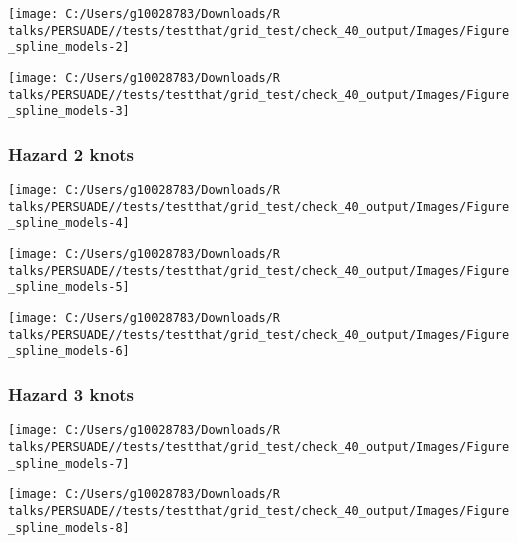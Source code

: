 \documentclass[
]{article}
\begin{document}
\begin{flushleft}\texttt{[image: C:/Users/g10028783/Downloads/R talks/PERSUADE//tests/testthat/grid\_test/check\_40\_output/Images/Figure\_spline\_models-2]} \end{flushleft}

\begin{flushleft}\texttt{[image: C:/Users/g10028783/Downloads/R talks/PERSUADE//tests/testthat/grid\_test/check\_40\_output/Images/Figure\_spline\_models-3]} \end{flushleft}

\clearpage

\subsubsection{Hazard 2 knots}\label{hazard-2-knots}

\begin{flushleft}\texttt{[image: C:/Users/g10028783/Downloads/R talks/PERSUADE//tests/testthat/grid\_test/check\_40\_output/Images/Figure\_spline\_models-4]} \end{flushleft}

\begin{flushleft}\texttt{[image: C:/Users/g10028783/Downloads/R talks/PERSUADE//tests/testthat/grid\_test/check\_40\_output/Images/Figure\_spline\_models-5]} \end{flushleft}

\begin{flushleft}\texttt{[image: C:/Users/g10028783/Downloads/R talks/PERSUADE//tests/testthat/grid\_test/check\_40\_output/Images/Figure\_spline\_models-6]} \end{flushleft}

\clearpage

\subsubsection{Hazard 3 knots}\label{hazard-3-knots}

\begin{flushleft}\texttt{[image: C:/Users/g10028783/Downloads/R talks/PERSUADE//tests/testthat/grid\_test/check\_40\_output/Images/Figure\_spline\_models-7]} \end{flushleft}

\begin{flushleft}\texttt{[image: C:/Users/g10028783/Downloads/R talks/PERSUADE//tests/testthat/grid\_test/check\_40\_output/Images/Figure\_spline\_models-8]} \end{flushleft}
\end{document}
